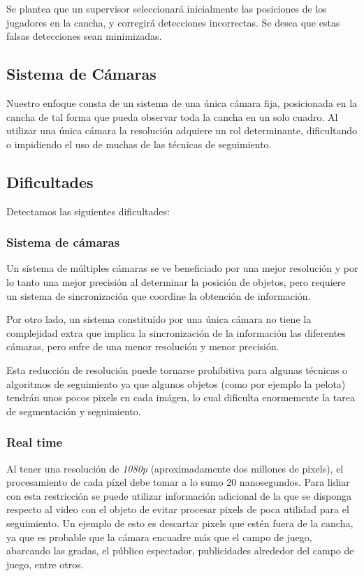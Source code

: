 \documentclass[a4paper,10pt]{article}
\begin{document}
Se plantea que un supervisor seleccionará inicialmente las posiciones de los
jugadores en la cancha, y corregirá detecciones incorrectas. Se desea que estas
falsas detecciones sean minimizadas.

\subsection{Sistema de Cámaras}

Nuestro enfoque consta de un sistema de una única cámara fija, posicionada en
la cancha de tal forma que pueda observar toda la cancha en un solo cuadro. Al
utilizar una única cámara la resolución adquiere un rol determinante,
dificultando o impidiendo el uso de muchas de las técnicas de seguimiento.

\subsection{Dificultades}

Detectamos las siguientes dificultades:

\subsubsection{Sistema de cámaras}

Un sistema de múltiples cámaras se ve beneficiado por una mejor resolución y
por lo tanto una mejor precisión al determinar la posición de objetos, pero
requiere un sistema de sincronización que coordine la obtención de información.

Por otro lado, un sistema constituído por una única cámara no tiene la
complejidad extra que implica la sincronización de la información las
diferentes cámaras, pero sufre de una menor resolución y menor precisión.

Esta reducción de resolución puede tornarse prohibitiva para algunas técnicas o
algoritmos de seguimiento ya que algunos objetos (como por ejemplo la pelota)
tendrán unos pocos pixels en cada imágen, lo cual dificulta enormemente la
tarea de segmentación y seguimiento.

\subsubsection{Real time}

Al tener una resolución de \textit{1080p} (aproximadamente dos millones de
pixels), el procesamiento de cada píxel debe tomar a lo sumo 20 nanosegundos.
Para lidiar con esta restricción se puede utilizar información adicional de la
que se disponga respecto al video con el objeto de evitar procesar pixels de
poca utilidad para el seguimiento. Un ejemplo de esto es descartar pixels que
estén fuera de la cancha, ya que es probable que la cámara encuadre más que el
campo de juego, abarcando las gradas, el público espectador, publicidades
alrededor del campo de juego, entre otros.
\end{document}
